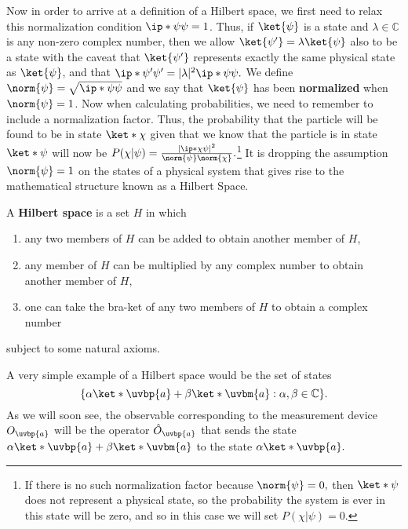 Now in order to arrive at a definition of a Hilbert space, we first need to relax this normalization condition $\ip*{\psi}{\psi}=1$. Thus, if $\ket{\psi}$  is a state and $\lambda\in\mathbb{C}$ is any non-zero complex number, then we allow $\ket{\psi'}=\lambda\ket{\psi}$ also to be a state with the caveat that $\ket{\psi'}$ represents exactly the same physical state as $\ket{\psi}$, and that $\ip*{\psi'}{\psi'}=|\lambda|^2\ip*{\psi}{\psi}.$ We define $\norm{\psi}=\sqrt{\ip*{\psi}{\psi}}$ and we say that $\ket{\psi}$ has been \textbf{normalized} when $\norm{\psi}=1$. Now when calculating probabilities, we need to remember to include a normalization factor. Thus, the probability that the particle will be found to be in state $\ket*{\chi}$ given that we know that the particle is in state $\ket*{\psi}$ will now be $P(\chi|\psi) = \frac{|\ip*{\chi}{\psi}|^2}{\norm{\psi}\norm{\chi}}.$\footnote{ If there is no such normalization factor because $\norm{\psi}=0,$ then $\ket*{\psi}$ does not represent a physical state, so the probability the system is ever in this state will be zero, and so in this case we will set $P(\chi|\psi)=0.$} It is  dropping the assumption $\norm{\psi}=1$ on the states of a physical system that gives rise to the mathematical structure known as a Hilbert Space.   

A \textbf{Hilbert space} is a set $H$ in which 
\begin{enumerate}[noitemsep, nosep, topsep=0pt]
\item any two members of $H$ can be added to obtain another member of $H$, 
\item any member of $H$ can be multiplied by any complex number to obtain another member of $H$,
\item one can take the bra-ket of any two members of $H$ to obtain a complex number\end{enumerate}
subject to some natural axioms.\footnotemark

A very simple example of a Hilbert space would be the set of states 
$$\{\alpha\ket*{\uvbp{a}}+\beta\ket*{\uvbm{a}}:\alpha,\beta\in\mathbb{C}\}.$$ 
As we will soon see, the observable corresponding to the measurement device $O_{\uvbp{a}}$ will be the operator $\hat{O}_{\uvbp{a}}$ that sends the state $\alpha\ket*{\uvbp{a}}+\beta\ket*{\uvbm{a}}$ to the state $\alpha\ket*{\uvbp{a}}.$

